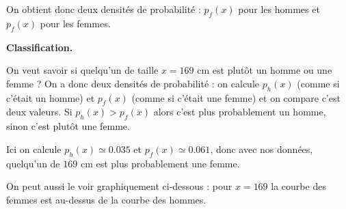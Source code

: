 \documentclass[11pt,class=report,crop=false]{standalone}
\begin{document}
\begin{cours}
On obtient donc deux densités de probabilité : $p_f(x)$ pour les hommes et $p_f(x)$ pour les femmes.


\bigskip

\textbf{Classification.}

On veut savoir si quelqu'un de taille $x=169$ cm est plutôt un homme ou une femme ?
On a donc deux densités de probabilité : on calcule $p_h(x)$ (comme si c'était un homme) et $p_f(x)$ (comme si c'était une femme) et on compare c'est deux valeurs.
Si $p_h(x)>p_f(x)$ alors c'est plus probablement un homme, sinon c'est plutôt une femme. 

Ici on calcule $p_h(x) \simeq 0.035$ et $p_f(x) \simeq 0.061$, donc avec nos données, quelqu'un de $169$ cm est plus probablement une femme.

On peut aussi le voir graphiquement ci-dessous : pour $x=169$ la courbe des femmes est au-dessus de la courbe des hommes. 


\end{cours}



\end{document}
